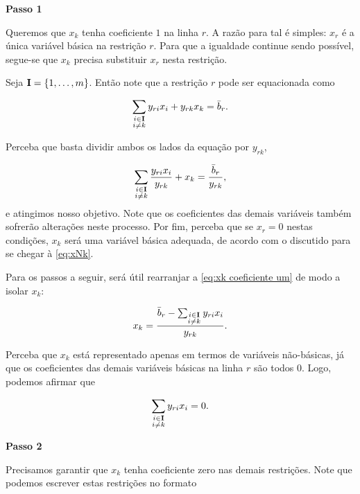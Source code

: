 \textbf{Passo 1}

Queremos que $x_{k}$ tenha coeficiente $1$ na linha $r$. A razão para tal é simples: $x_{r}$ é a única variável básica na restrição $r$. Para que a igualdade continue sendo possível, segue-se que $x_{k}$ precisa substituir $x_{r}$ nesta restrição.

Seja $ \vb I = \{1,\ldots,m\}$. Então note que a restrição $r$ pode ser equacionada como

\begin{equation}\label{eq:r-ésima linha tabela}
    \sum_{\substack{i \in  \vb I \\ i \neq k}}{ y_{ri}x_{i}} +  y_{rk}x_{k} = \bar{b}_{r}.
\end{equation}

Perceba que basta dividir ambos os lados da equação por $ y_{rk}$,

\begin{equation}\label{eq:xk coeficiente um}
    \sum_{\substack{i \in  \vb I \\ i \neq k}}\frac{{ y_{ri}x_{i}}}{ y_{rk}} + x_{k} = \frac{\bar{b}_{r}}{ y_{rk}},
\end{equation}
e atingimos nosso objetivo. Note que os coeficientes das demais variáveis também sofrerão alterações neste processo. Por fim, perceba que se $x_{r} = 0$ nestas condições, $x_{k}$ será uma variável básica adequada, de acordo com o discutido para se chegar à \cref{eq:xNk}.

Para os passos a seguir, será útil rearranjar a \cref{eq:xk coeficiente um} de modo a isolar $x_{k}$:

\begin{equation}\label{eq:xk isolado}
    x_{k} = \frac{\bar{b}_{r} - \sum_{\substack{i \in  \vb I \\ i \neq k}}{ y_{ri}x_{i}}}{ y_{rk}}.
\end{equation}

Perceba que $x_{k}$ está representado apenas em termos de variáveis não-básicas, já que os coeficientes das demais variáveis básicas na linha $r$ são todos $0$. Logo, podemos afirmar que

\begin{equation}\label{eq:soma não-básica zero}
    \sum_{\substack{i \in  \vb I \\ i \neq k}}{ y_{ri}x_{i}} = 0.
\end{equation}

\textbf{Passo 2}

Precisamos garantir que $x_{k}$ tenha coeficiente zero nas demais restrições. Note que podemos escrever estas restrições no formato

